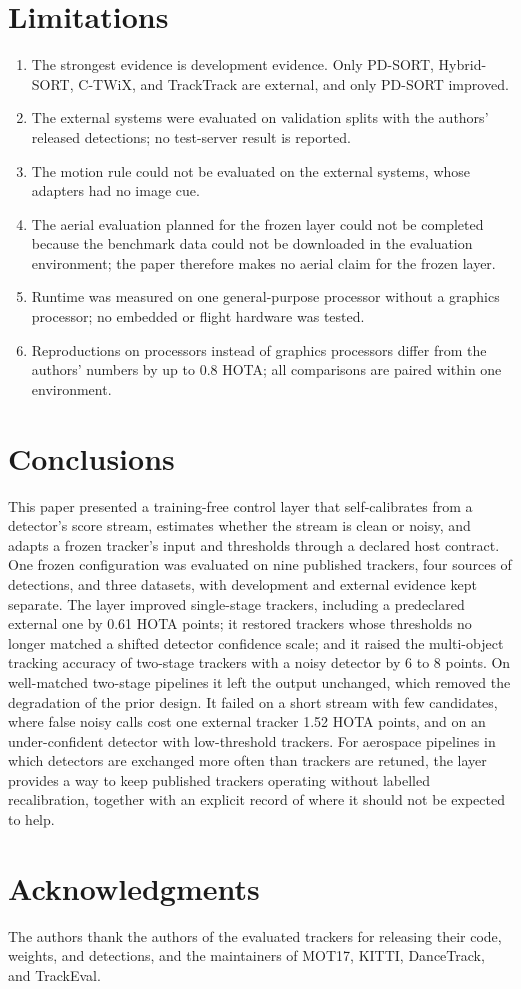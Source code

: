 \documentclass[journal]{new-aiaa}
\begin{document}
\section{Limitations}\label{sec:limits}
\begin{enumerate}
\item The strongest evidence is development evidence. Only PD-SORT, Hybrid-SORT, C-TWiX, and TrackTrack are external, and only PD-SORT improved.
\item The external systems were evaluated on validation splits with the authors' released detections; no test-server result is reported.
\item The motion rule could not be evaluated on the external systems, whose adapters had no image cue.
\item The aerial evaluation planned for the frozen layer could not be completed because the benchmark data could not be downloaded in the evaluation environment; the paper therefore makes no aerial claim for the frozen layer.
\item Runtime was measured on one general-purpose processor without a graphics processor; no embedded or flight hardware was tested.
\item Reproductions on processors instead of graphics processors differ from the authors' numbers by up to 0.8 HOTA; all comparisons are paired within one environment.
\end{enumerate}

\section{Conclusions}\label{sec:conclusions}
This paper presented a training-free control layer that self-calibrates from a detector's score stream, estimates whether the stream is clean or noisy, and adapts a frozen tracker's input and thresholds through a declared host contract. One frozen configuration was evaluated on nine published trackers, four sources of detections, and three datasets, with development and external evidence kept separate. The layer improved single-stage trackers, including a predeclared external one by 0.61 HOTA points; it restored trackers whose thresholds no longer matched a shifted detector confidence scale; and it raised the multi-object tracking accuracy of two-stage trackers with a noisy detector by 6 to 8 points. On well-matched two-stage pipelines it left the output unchanged, which removed the degradation of the prior design. It failed on a short stream with few candidates, where false noisy calls cost one external tracker 1.52 HOTA points, and on an under-confident detector with low-threshold trackers. For aerospace pipelines in which detectors are exchanged more often than trackers are retuned, the layer provides a way to keep published trackers operating without labelled recalibration, together with an explicit record of where it should not be expected to help.

\section*{Acknowledgments}
The authors thank the authors of the evaluated trackers for releasing their code, weights, and detections, and the maintainers of MOT17, KITTI, DanceTrack, and TrackEval.


\end{document}

